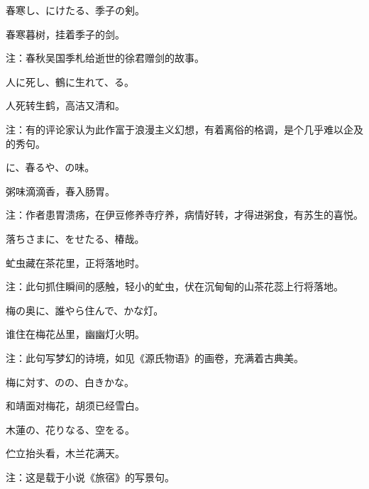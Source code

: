\begin{haiku}
    {\FH 春寒し、にけたる、季子の剣。}

    {\FK 春寒暮树，挂着季子的剑。}

    {\FT 注：春秋吴国季札给逝世的徐君赠剑的故事。}
\end{haiku}

\begin{haiku}
    {\FH 人に死し、鶴に生れて、る。}

    {\FK 人死转生鹤，高洁又清和。}

    {\FT 注：有的评论家认为此作富于浪漫主义幻想，有着离俗的格调，是个几乎难以企及的秀句。}
\end{haiku}

\begin{haiku}
    {\FH {}に、春るや、の味。}

    {\FK 粥味滴滴香，春入肠胃。}

    {\FT 注：作者患胃溃疡，在伊豆修养寺疗养，病情好转，才得进粥食，有苏生的喜悦。}
\end{haiku}

\begin{haiku}
    {\FH 落ちさまに、をせたる、椿哉。}

    {\FK 虻虫藏在茶花里，正将落地时。}

    {\FT 注：此句抓住瞬间的感触，轻小的虻虫，伏在沉甸甸的山茶花蕊上行将落地。}
\end{haiku}

\begin{haiku}
    {\FH 梅の奥に、誰やら住んで、かな灯。}

    {\FK 谁住在梅花丛里，幽幽灯火明。}

    {\FT 注：此句写梦幻的诗境，如见《源氏物语》的画卷，充满着古典美。}
\end{haiku}

\begin{haiku}
    {\FH 梅に対す、のの、白きかな。}

    {\FK 和靖面对梅花，胡须已经雪白。}
\end{haiku}

\begin{haiku}
    {\FH 木蓮の、花りなる、空をる。}

    {\FK 伫立抬头看，木兰花满天。}

    {\FT 注：这是载于小说《旅宿》的写景句。}
\end{haiku}

